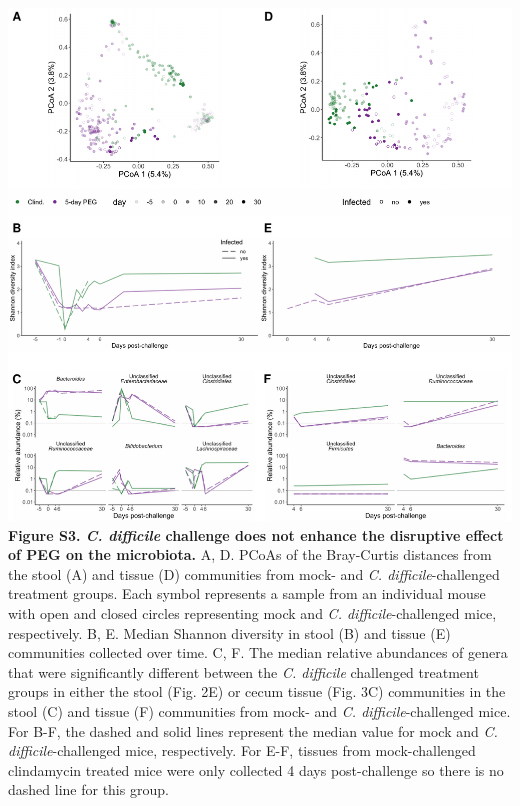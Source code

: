 \documentclass[
  11pt,
]{article}
\begin{document}
\includegraphics{figure_S3.pdf} \textbf{Figure S3. \emph{C. difficile}
challenge does not enhance the disruptive effect of PEG on the
microbiota.} A, D. PCoAs of the Bray-Curtis distances from the stool (A)
and tissue (D) communities from mock- and \emph{C. difficile}-challenged
treatment groups. Each symbol represents a sample from an individual
mouse with open and closed circles representing mock and \emph{C.
difficile}-challenged mice, respectively. B, E. Median Shannon diversity
in stool (B) and tissue (E) communities collected over time. C, F. The
median relative abundances of genera that were significantly different
between the \emph{C. difficile} challenged treatment groups in either
the stool (Fig. 2E) or cecum tissue (Fig. 3C) communities in the stool
(C) and tissue (F) communities from mock- and \emph{C.
difficile}-challenged mice. For B-F, the dashed and solid lines
represent the median value for mock and \emph{C. difficile}-challenged
mice, respectively. For E-F, tissues from mock-challenged clindamycin
treated mice were only collected 4 days post-challenge so there is no
dashed line for this group. \newpage
\end{document}
